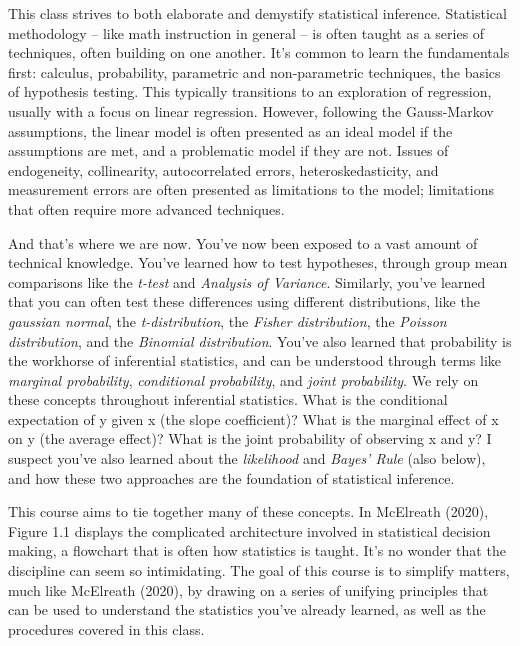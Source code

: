 \documentclass[
]{book}
\begin{document}
This class strives to both elaborate and demystify statistical inference. Statistical methodology -- like math instruction in general -- is often taught as a series of techniques, often building on one another. It's common to learn the fundamentals first: calculus, probability, parametric and non-parametric techniques, the basics of hypothesis testing. This typically transitions to an exploration of regression, usually with a focus on linear regression. However, following the Gauss-Markov assumptions, the linear model is often presented as an ideal model if the assumptions are met, and a problematic model if they are not. Issues of endogeneity, collinearity, autocorrelated errors, heteroskedasticity, and measurement errors are often presented as limitations to the model; limitations that often require more advanced techniques.

And that's where we are now. You've now been exposed to a vast amount of technical knowledge. You've learned how to test hypotheses, through group mean comparisons like the \emph{t-test} and \emph{Analysis of Variance}. Similarly, you've learned that you can often test these differences using different distributions, like the \emph{gaussian normal}, the \emph{t-distribution}, the \emph{Fisher distribution}, the \emph{Poisson distribution}, and the \emph{Binomial distribution}. You've also learned that probability is the workhorse of inferential statistics, and can be understood through terms like \emph{marginal probability}, \emph{conditional probability}, and \emph{joint probability}. We rely on these concepts throughout inferential statistics. What is the conditional expectation of y given x (the slope coefficient)? What is the marginal effect of x on y (the average effect)? What is the joint probability of observing x and y? I suspect you've also learned about the \emph{likelihood} and \emph{Bayes' Rule} (also below), and how these two approaches are the foundation of statistical inference.

This course aims to tie together many of these concepts. In McElreath (2020), Figure 1.1 displays the complicated architecture involved in statistical decision making, a flowchart that is often how statistics is taught. It's no wonder that the discipline can seem so intimidating. The goal of this course is to simplify matters, much like McElreath (2020), by drawing on a series of unifying principles that can be used to understand the statistics you've already learned, as well as the procedures covered in this class.
\end{document}

